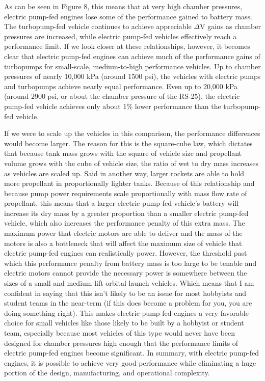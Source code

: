 \documentclass[12pt, letterpaper]{article}
\begin{document}
As can be seen in Figure 8, this means that at very high chamber pressures, electric pump-fed engines lose some of the performance gained to battery mass. The turbopump-fed vehicle continues to achieve appreciable $\Delta $V gains as chamber pressures are increased, while electric pump-fed vehicles effectively reach a performance limit. If we look closer at these relationships, however, it becomes clear that electric pump-fed engines can achieve much of the performance gains of turbopumps for  small-scale, medium-to-high performance vehicles. Up to chamber pressures of nearly 10,000 kPa (around 1500 psi), the vehicles with electric pumps and turbopumps achieve nearly equal performance. Even up to 20,000 kPa (around 2900 psi, or about the chamber pressure of the RS-25), the electric pump-fed vehicle achieves only about 1\% lower performance than the turbopump-fed vehicle.

If we were to scale up the vehicles in this comparison, the performance differences would become larger. The reason for this is the square-cube law, which dictates that because tank mass grows with the square of vehicle size and propellant volume grows with the cube of vehicle size, the ratio of wet to dry mass increases as vehicles are scaled up. Said in another way, larger rockets are able to hold more propellant in proportionally lighter tanks. Because of this relationship and because pump power requirements scale proportionally with mass flow rate of propellant, this means that a larger electric pump-fed vehicle's battery will increase its dry mass by a greater proportion than a smaller electric pump-fed vehicle, which also increases the performance penalty of this extra mass. The maximum power that electric motors are able to deliver and the mass of the motors is also a bottleneck that will affect the maximum size of vehicle that electric pump-fed engines can realistically power. However, the threshold past which this performance penalty from battery mass is too large to be tenable and electric motors cannot provide the necessary power is somewhere between the sizes of a small and medium-lift orbital launch vehicles. Which means that I am confident in saying that this isn't likely to be an issue for most hobbyists and student teams in the near-term (if this does become a problem for you, you are doing something right). This makes electric pump-fed engines a very favorable choice for small vehicles like those likely to be built by a hobbyist or student team, especially because most vehicles of this type would never have been designed for chamber pressures high enough that the performance limits of electric pump-fed engines become significant. In summary, with electric pump-fed engines, it is possible to achieve very good performance while eliminating a huge portion of the design, manufacturing, and operational complexity.
\end{document}

